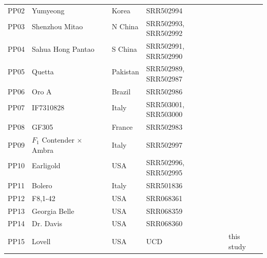 \documentclass[12pt]{article}
\begin{document}
\begin{center}
\begin{longtable}{lllll}
                 PP02 &Yumyeong &Korea &SRR502994 &\citealt{verde2013high}\\
                 PP03 &Shenzhou Mitao&N China &
		\multirow{2}{1cm}{SRR502993, SRR502992} &\citealt{verde2013high}\\
                 \\
                 PP04 &Sahua Hong Pantao &S China &
		\multirow{2}{1cm}{SRR502991, SRR502990} &\citealt{verde2013high}\\
                 \\
                 PP05 &Quetta &Pakistan &
		\multirow{2}{1cm}{SRR502989, SRR502987} &\citealt{verde2013high}\\
                 \\
                 PP06 &Oro A &Brazil &SRR502986 &\citealt{verde2013high}\\
                 PP07 &IF7310828 &Italy &
		\multirow{2}{1cm}{SRR503001, SRR503000} &\citealt{verde2013high}\\
                 \\
                 PP08 &GF305 &France &SRR502983 &\citealt{verde2013high}\\
                 PP09 &$F_1$ Contender $\times$ Ambra &Italy &SRR502997 &\citealt{verde2013high}\\
                 PP10 &Earligold &USA &
		\multirow{2}{1cm}{SRR502996, SRR502995} &\citealt{verde2013high}\\
                 \\
                 PP11 &Bolero &Italy &SRR501836 &\citealt{verde2013high}\\
                 PP12 &F8,1-42 &USA &SRR068361 &\citealt{ahmad2011whole} \\
		 PP13 &Georgia Belle &USA &SRR068359 &\citealt{ahmad2011whole} \\
                 PP14 &Dr. Davis &USA &SRR068360 &\citealt{ahmad2011whole} \\
                 PP15 &Lovell &USA &UCD &this study\\

\end{longtable}
\end{center}
\end{document}
